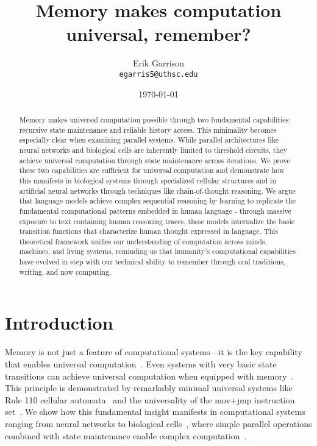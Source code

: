 \documentclass[12pt]{article}
\title{Memory makes computation universal, remember?}
\author{Erik Garrison\\
  \texttt{egarris5@uthsc.edu}\\[1ex]
  }
\date{\today}
\begin{document}
\maketitle

\begin{abstract}
Memory makes universal computation possible through two fundamental capabilities: recursive state maintenance and reliable history access.
This minimality becomes especially clear when examining parallel systems.
While parallel architectures like neural networks and biological cells are inherently limited to threshold circuits, they achieve universal computation through state maintenance across iterations.
We prove these two capabilities are sufficient for universal computation and demonstrate how this manifests in biological systems through specialized cellular structures and in artificial neural networks through techniques like chain-of-thought reasoning.
We argue that language models achieve complex sequential reasoning by learning to replicate the fundamental computational patterns embedded in human language - through massive exposure to text containing human reasoning traces, these models internalize the basic transition functions that characterize human thought expressed in language.
This theoretical framework unifies our understanding of computation across minds, machines, and living systems, reminding us that humanity's computational capabilities have evolved in step with our technical ability to remember through oral traditions, writing, and now computing.
\end{abstract}

\section{Introduction}
Memory is not just a feature of computational systems—it is the key capability that enables universal computation~\cite{turing1936computable}.
Even systems with very basic state transitions can achieve universal computation when equipped with memory~\cite{merrill2023parallelism,peng2024limitations}.
This principle is demonstrated by remarkably minimal universal systems like Rule 110 cellular automata~\cite{cook2004universality} and the universality of the mov+jmp instruction set~\cite{savage1994space}.
We show how this fundamental insight manifests in computational systems ranging from neural networks to biological cells~\cite{wang2023parallel}, where simple parallel operations combined with state maintenance enable complex computation~\cite{swamy1983space,bisaz2024memory}.
\end{document}
